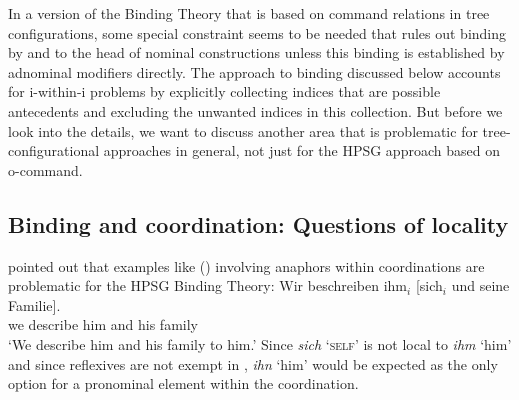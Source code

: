 \documentclass[output=paper
 	        ,biblatex
                ,babelshorthands
                ,newtxmath
                ,draftmode
                ,colorlinks, citecolor=brown
]{langscibook}
\begin{document}
In a version of the Binding Theory that is based on command relations in tree configurations, some
special constraint seems to be needed that rules out binding by and to the head of nominal 
constructions unless this binding is established by adnominal modifiers directly. The approach to
binding discussed below accounts for i-within-i problems by explicitly collecting
indices that are possible antecedents and excluding the unwanted indices in this collection. But
before we look into the details, we want to discuss another area that is problematic for
tree-configurational approaches in general, not just for the HPSG approach based on o-command.





\subsection{Binding and coordination: Questions of locality}
\label{binding:sec-locality}


\citet[Section~20.4.7]{Mueller99a} pointed out that examples like () involving anaphors
within coordinations are problematic for the HPSG Binding Theory:
\ea
\label{ex-sich-und-seine-familie}
\gll Wir beschreiben ihm$_{i}$ [sich$_{i}$       und seine Familie].\\
     we describe     him      \spacebr{}\self{} and his family\\
\glt `We describe him and his family to him.'
\z
Since \emph{sich} `\textsc{self}' is not local to \emph{ihm} `him' and since reflexives are not exempt in 
\citep[--159]{Kiss2012a}, \emph{ihn} `him' would be expected as the only option for a pronominal element within
the coordination.
\end{document}
